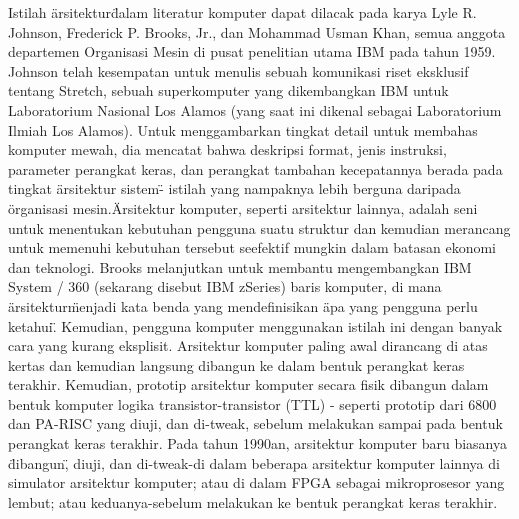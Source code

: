{Istilah \"arsitektur\" dalam literatur komputer dapat dilacak pada karya Lyle R. Johnson, Frederick P. Brooks, Jr., dan Mohammad Usman Khan, semua anggota departemen Organisasi Mesin di pusat penelitian utama IBM pada tahun 1959. Johnson telah kesempatan untuk menulis sebuah komunikasi riset eksklusif tentang Stretch, sebuah superkomputer yang dikembangkan IBM untuk Laboratorium Nasional Los Alamos (yang saat ini dikenal sebagai Laboratorium Ilmiah Los Alamos). Untuk menggambarkan tingkat detail untuk membahas komputer mewah, dia mencatat bahwa deskripsi format, jenis instruksi, parameter perangkat keras, dan perangkat tambahan kecepatannya berada pada tingkat \"arsitektur sistem\" - istilah yang nampaknya lebih berguna daripada \"organisasi mesin.\"
Arsitektur komputer, seperti arsitektur lainnya, adalah seni untuk menentukan kebutuhan pengguna suatu struktur dan kemudian merancang untuk memenuhi kebutuhan tersebut seefektif mungkin dalam batasan ekonomi dan teknologi.
Brooks melanjutkan untuk membantu mengembangkan IBM System / 360 (sekarang disebut IBM zSeries) baris komputer, di mana \"arsitektur\" menjadi kata benda yang mendefinisikan \"apa yang pengguna perlu ketahui\". Kemudian, pengguna komputer menggunakan istilah ini dengan banyak cara yang kurang eksplisit. \cite{hellige2004genese}
Arsitektur komputer paling awal dirancang di atas kertas dan kemudian langsung dibangun ke dalam bentuk perangkat keras terakhir. \cite{copeland2005alan} Kemudian, prototip arsitektur komputer secara fisik dibangun dalam bentuk komputer logika transistor-transistor (TTL) - seperti prototip dari 6800 dan PA-RISC yang diuji, dan di-tweak, sebelum melakukan sampai pada bentuk perangkat keras terakhir. Pada tahun 1990an, arsitektur komputer baru biasanya \"dibangun\", diuji, dan di-tweak-di dalam beberapa arsitektur komputer lainnya di simulator arsitektur komputer; atau di dalam FPGA sebagai mikroprosesor yang lembut; atau keduanya-sebelum melakukan ke bentuk perangkat keras terakhir. \cite{hellige2004genese}
}

